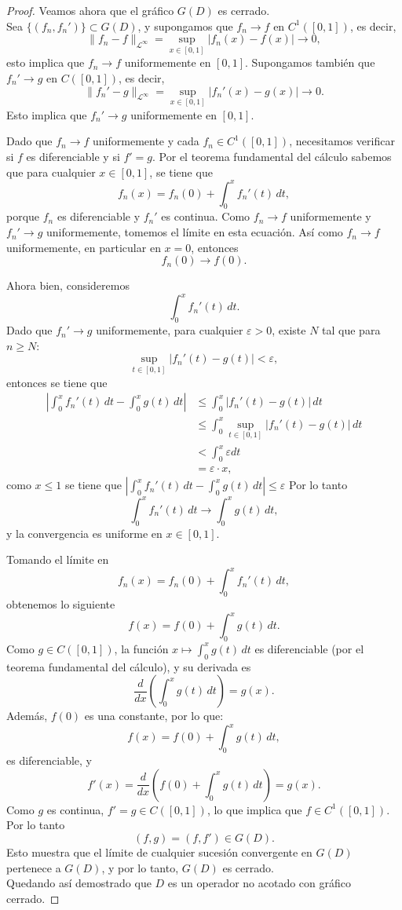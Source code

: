 \begin{proof}
Veamos ahora que el gráfico $G(D)$ es cerrado.\\

Sea $\{(f_n, f_n')\} \subset G(D)$, y supongamos que $f_n \to f$ en $C^1([0,1])$, es decir,
    $$\|f_n - f\|_{\mathcal{L}^\infty} = \sup_{x \in [0,1]} |f_n(x) - f(x)| \to 0,$$
esto implica que $f_n \to f$ uniformemente en \([0,1]\). Supongamos también que $f_n' \to g$ en $C([0,1])$, es decir,
    $$\|f_n' - g\|_{\mathcal{L}^\infty} = \sup_{x \in [0,1]} |f_n'(x) - g(x)| \to 0.$$
Esto implica que $f_n' \to g$ uniformemente en \([0,1]\).

Dado que $f_n \to f$ uniformemente y cada $f_n \in C^1([0,1])$, necesitamos verificar si $f$ es diferenciable y si $f' = g$. Por el teorema fundamental del cálculo sabemos que para cualquier $x \in [0,1]$, se tiene que
$$f_n(x) = f_n(0) + \int_0^x f_n'(t) \, dt,$$
porque $f_n$ es diferenciable y $f_n'$ es continua. Como $f_n \to f$ uniformemente y $f_n' \to g$ uniformemente, tomemos el límite en esta ecuación. Así como $f_n \to f$ uniformemente, en particular en $x = 0$, entonces
  $$f_n(0) \to f(0).$$

Ahora bien, consideremos
  $$\int_0^x f_n'(t) \, dt.$$
  Dado que $f_n' \to g$ uniformemente, para cualquier $\varepsilon > 0$, existe $N$ tal que para $n \geq N$:
  $$
  \sup_{t \in [0,1]} |f_n'(t) - g(t)| < \varepsilon,
  $$
  entonces se tiene que
  \begin{align*}
      \left| \int_0^x f_n'(t) \, dt - \int_0^x g(t) \, dt \right| &\leq \int_0^x |f_n'(t) - g(t)| \, dt\\
      &\leq \int_0^x \sup_{t \in [0,1]} |f_n'(t) - g(t)| \, dt\\
      &< \int_0^x \varepsilon dt\\
      &= \varepsilon \cdot x,
  \end{align*}
como $x\leq 1$ se tiene que $\left| \int_0^x f_n'(t) \, dt - \int_0^x g(t) \, dt \right|\leq \varepsilon$
 Por lo tanto
  $$
  \int_0^x f_n'(t) \, dt \to \int_0^x g(t) \, dt,
  $$
  y la convergencia es uniforme en $x \in [0,1]$.

Tomando el límite en
$$
f_n(x) = f_n(0) + \int_0^x f_n'(t) \, dt,
$$
obtenemos lo siguiente
$$
f(x) = f(0) + \int_0^x g(t) \, dt.
$$
Como $g \in C([0,1])$, la función $x \mapsto \int_0^x g(t) \, dt$ es diferenciable (por el teorema fundamental del cálculo), y su derivada es
$$
\frac{d}{dx} \left( \int_0^x g(t) \, dt \right) = g(x).
$$
Además, $f(0)$ es una constante, por lo que:
$$
f(x) = f(0) + \int_0^x g(t) \, dt,
$$
es diferenciable, y
$$
f'(x) = \frac{d}{dx} \left( f(0) + \int_0^x g(t) \, dt \right) = g(x).
$$
Como $g$ es continua, $f' = g \in C([0,1])$, lo que implica que $f \in C^1([0,1])$. Por lo tanto
$$
(f, g) = (f, f') \in G(D).
$$
Esto muestra que el límite de cualquier sucesión convergente en $G(D)$ pertenece a $G(D)$, y por lo tanto, $G(D)$ es cerrado.\\

Quedando así demostrado que $D$ es un operador no acotado con gráfico cerrado.


\end{proof}